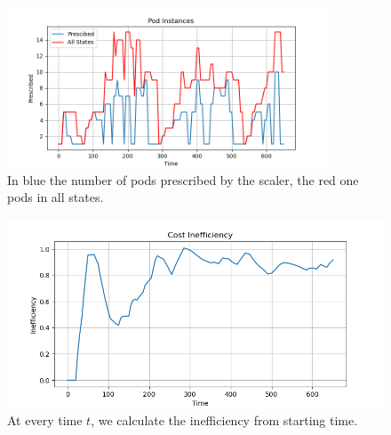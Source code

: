 \begin{figure}[H]
    \centering
    \includegraphics[width=0.85\textwidth]{images/Exponential/pods.png}
    \caption{In blue the number of pods prescribed by the scaler, the red one pods in all states.}
    \label{fig:exponential_pods}
\end{figure}
\begin{figure}[H]
\centering
    \includegraphics[width=0.85\linewidth]{images/Exponential/inefficiency_cumulative.png}
    \caption{At every time $t$, we calculate the inefficiency from starting time.}
    \label{fig:exponential_inefficiency}
\end{figure}